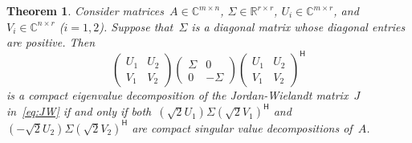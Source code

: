 \documentclass[11pt,a4paper]{article}
\newtheorem{theorem}{Theorem}%
\theoremstyle{definition}
\def\real{\mathbb{R}}
\def\CC{\mathbb{C}}
\newcommand{\hmt}{{\scriptscriptstyle{{\mathsf{H}}}}}
\begin{document}
\begin{theorem}
  \label{th:lanczos}
  Consider matrices~$A\in \CC^{m\times n}$, $\Sigma \in \real^{r\times r}$, $U_i \in
  \CC^{m\times r}$, and $V_i \in \CC^{n\times r}$ \textnormal{(}$i=1,2$\textnormal{)}. 
  Suppose that~$\Sigma$ is a diagonal matrix
  whose diagonal entries are positive. Then
  \begin{equation}
    \label{eq:evdJ}
    \begin{pmatrix}
      U_1 & U_2 \\
      V_1 & V_2 
    \end{pmatrix}
    \begin{pmatrix}
      \Sigma & 0\\
      0 & -\Sigma
    \end{pmatrix}
    \begin{pmatrix}
      U_1 & U_2 \\
      V_1 & V_2 
    \end{pmatrix}^\hmt
  \end{equation}
  is a compact eigenvalue decomposition of the Jordan-Wielandt matrix~$J$ in~\eqref{eq:JW}
  if and only if both~$(\sqrt{2} U_1)\Sigma (\sqrt{2} V_1)^\hmt$ and~$(-\sqrt{2}U_2)\Sigma (\sqrt{2}V_2)^\hmt$ are
  compact singular value decompositions of~$A$. 
\end{theorem}
\end{document}
